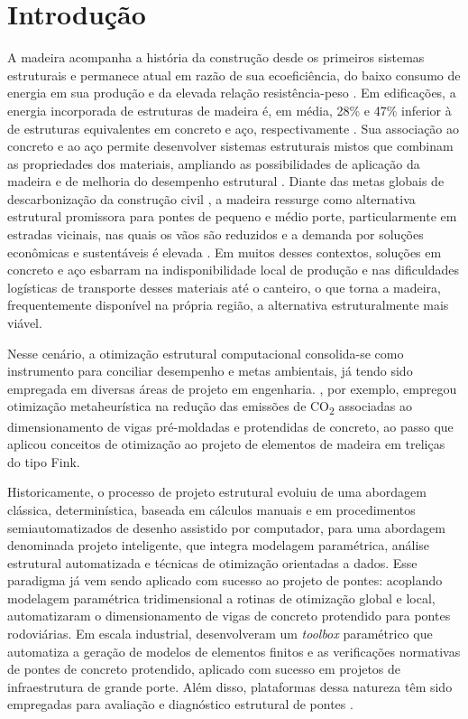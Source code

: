 
\chapter{Introdução}\label{sec:introducao}

A madeira acompanha a história da construção desde os primeiros sistemas estruturais e permanece atual em razão de sua ecoeficiência, do baixo consumo de energia em sua produção e da elevada relação resistência-peso \parencite{FRAGA2025}.
Em edificações, a energia incorporada de estruturas de madeira é, em média, 28\% e 47\% inferior à de estruturas equivalentes em concreto e aço, respectivamente \parencite{Schenk2022}.
Sua associação ao concreto e ao aço permite desenvolver sistemas estruturais mistos que combinam as propriedades dos materiais, ampliando as possibilidades de aplicação da madeira e de melhoria do desempenho estrutural \parencite{PASTORI2022}.
Diante das metas globais de descarbonização da construção civil \parencite{Li2025}, a madeira ressurge como alternativa estrutural promissora para pontes de pequeno e médio porte, particularmente em estradas vicinais, nas quais os vãos são reduzidos e a demanda por soluções econômicas e sustentáveis é elevada \parencite{Milani2020}.
Em muitos desses contextos, soluções em concreto e aço esbarram na indisponibilidade local de produção e nas dificuldades logísticas de transporte desses materiais até o canteiro, o que torna a madeira, frequentemente disponível na própria região, a alternativa estruturalmente mais viável.

Nesse cenário, a otimização estrutural computacional consolida-se como instrumento para conciliar desempenho e metas ambientais, já tendo sido empregada em diversas áreas de projeto em engenharia. \textcite{Moraes2022}, por exemplo, empregou otimização metaheurística na redução das emissões de CO\textsubscript{2} associadas ao dimensionamento de vigas pré-moldadas e protendidas de concreto, ao passo que \textcite{FRAGA2025} aplicou conceitos de otimização ao projeto de elementos de madeira em treliças do tipo Fink.

Historicamente, o processo de projeto estrutural evoluiu de uma abordagem clássica, determinística, baseada em cálculos manuais e em procedimentos semiautomatizados de desenho assistido por computador, para uma abordagem denominada projeto inteligente, que integra modelagem paramétrica, análise estrutural automatizada e técnicas de otimização orientadas a dados.
Esse paradigma já vem sendo aplicado com sucesso ao projeto de pontes: acoplando modelagem paramétrica tridimensional a rotinas de otimização global e local, \textcite{deMoraes2025} automatizaram o dimensionamento de vigas de concreto protendido para pontes rodoviárias.
Em escala industrial, \textcite{Rajic2026} desenvolveram um \textit{toolbox} paramétrico que automatiza a geração de modelos de elementos finitos e as verificações normativas de pontes de concreto protendido, aplicado com sucesso em projetos de infraestrutura de grande porte.
Além disso, plataformas dessa natureza têm sido empregadas para avaliação e diagnóstico estrutural de pontes \parencite{Garbowski2023, Alseid2025, Miluccio2026}.

